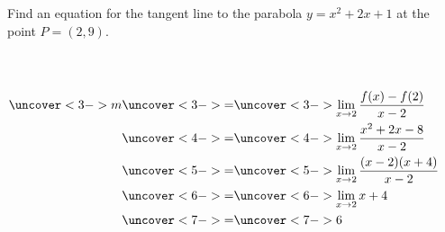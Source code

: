 \begin{frame}
\begin{example}
Find an equation for the tangent line to the parabola $y = x^2 +2x + 1$ at the point $P = (2,9)$.

\begin{columns}[c]
\ %
%
\abovedisplayskip=0pt
\belowdisplayskip=0pt
\abovedisplayshortskip=0pt
\belowdisplayshortskip=0pt
\begin{align*}
\uncover<3->{m} & \uncover<3->{ = }  \uncover<3->{\lim_{x\rightarrow 2} \frac{f(x)-f(2)}{x-2}}\\
& \uncover<4->{ = }  %
\uncover<4->{\lim_{x\rightarrow 2}\frac{x^2+2x - 8}{x-2}}\\
& \uncover<5->{ = }  %
\uncover<5->{\lim_{x\rightarrow 2}\frac{(x - 2)(x+4)}{x-2}}\\
& \uncover<6->{ = }  %
\uncover<6->{\lim_{x\rightarrow 2} x+4 }\\
& \uncover<7->{=} %
\uncover<7->{6 }
\end{align*}
\end{columns}
\end{example}
\end{frame}
